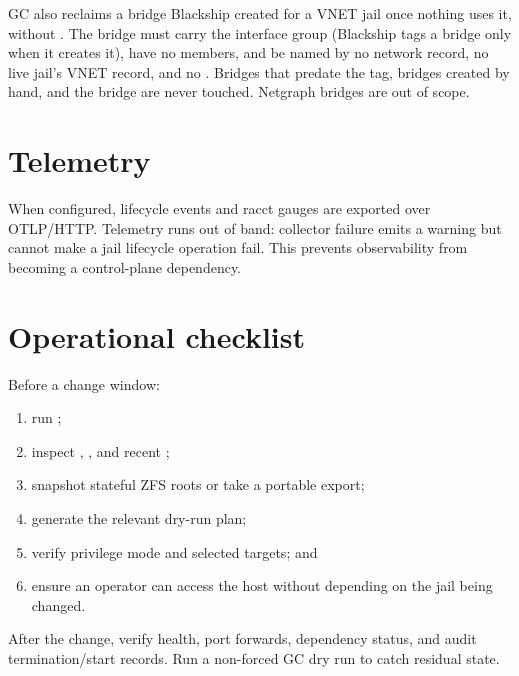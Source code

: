 GC also reclaims a bridge Blackship created for a VNET jail once nothing uses
it, without . The bridge must carry the 
interface group (Blackship tags a bridge only when it creates it), have no
members, and be named by no network record, no live jail's VNET record, and no
. Bridges that predate the tag, bridges created by
hand, and the  bridge are never touched. Netgraph
bridges are out of scope.

\section{Telemetry}

When configured, lifecycle events and racct gauges are exported over OTLP/HTTP.
Telemetry runs out of band: collector failure emits a warning but cannot make a
jail lifecycle operation fail. This prevents observability from becoming a
control-plane dependency.

\section{Operational checklist}

Before a change window:

\begin{enumerate}
  \item run ;
  \item inspect , , and recent ;
  \item snapshot stateful ZFS roots or take a portable export;
  \item generate the relevant dry-run plan;
  \item verify privilege mode and selected targets; and
  \item ensure an operator can access the host without depending on the jail
    being changed.
\end{enumerate}

After the change, verify health, port forwards, dependency status, and audit
termination/start records. Run a non-forced GC dry run to catch residual state.
